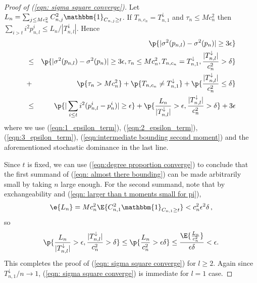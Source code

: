 \begin{proof}[Proof of (\ref{eqn: sigma square converge})]
Let $L_n=\sum_{j\le Mc_n^2}C^2_{n,j}\mathbbm{1}_{C_{n,j}\ge t}$. 
If $T_{n,c_n}=T^\downarrow_{n,1}$ 
and $\tau_n \le Mc^2_n$ 
then $\sum\limits_{i>t}i^2p^i_{n,l} \le {L_n}/|T^\downarrow_{n,l}|$.
Hence 
\begin{eqnarray}\label{eqn: almost there bounding}
&&\p{|\sigma^2(p_{n,l})-\sigma^2(p_n)|\ge 3\epsilon}\nonumber\\
&\le&\p{|\sigma^2(p_{n,l})-\sigma^2(p_n)|\ge 3\epsilon, \tau_n\le Mc^2_n, T_{n,c_n}=T^\downarrow_{n,1}, \frac{|T^\downarrow_{n,l}|}{c^2_n}>\delta}\nonumber\\
&+&\p{\tau_n>Mc^2_n}+\p{T_{n,c_n}\neq T^\downarrow_{n,1}}+\p{\frac{|T^\downarrow_{n,l}|}{c^2_n}\le\delta}\nonumber\\
&\le& \p{|\sum\limits_{i\le t}i^2(p^i_{n,l}-p^i_n)|\ge\epsilon}+\p{\frac{L_n}{|T^\downarrow_{n,l}|}>\epsilon, \frac{|T^\downarrow_{n,l}|}{c^2_n}>\delta}+3\epsilon
\end{eqnarray}
where we use (\ref{eqn:1_epsilon_term}), (\ref{eqn:2_epsilon_term}), (\ref{eqn:3_epsilon_term}), (\ref{eqn:intermediate bounding second moment}) and the aforementioned stochastic dominance in the last line.

Since $t$ is fixed, we can use (\ref{eqn:degree proportion converge}) to conclude that the first summand of (\ref{eqn: almost there bounding}) can be made arbitrarily small by taking $n$ large enough. For the second summand, 
note that by exchangeability and (\ref{eqn: larger than t moments small for pi}),
\[
\e{L_n}=Mc^2_n\E{C^2_{n,1}\mathbbm{1}_{C_{n,1}\ge t}}<c^2_n\epsilon^2\delta\, ,
\]
so 
\[\p{\frac{L_n}{|T^\downarrow_{n,l}|}>\epsilon, \frac{|T^\downarrow_{n,l}|}{c^2_n}>\delta}\le\p{\frac{L_n}{c^2_n}>\epsilon\delta}\le\frac{\E{\frac{L_n}{c^2_n}}}{\epsilon\delta}<\epsilon.
\]
This completes the proof of (\ref{eqn: sigma square converge}) for $l\ge 2$. Again since $T^\downarrow_{n,1}/n\to 1$, (\ref{eqn: sigma square converge}) is immediate for $l=1$ case.
\end{proof}

%


